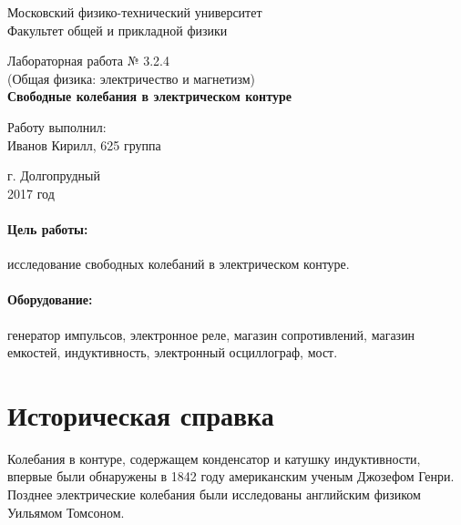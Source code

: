 \documentclass[12pt]{kiarticle}
\begin{document}
\begin{titlepage}
	\begin{center}
		\large 	Московский физико-технический университет \\
		Факультет общей и прикладной физики \\
		\vspace{0.2cm}
		
		\vspace{4.5cm}
		Лабораторная работа № 3.2.4 \\ \vspace{0.2cm}
		\large (Общая физика: электричество и магнетизм) \\ \vspace{0.2cm}
		\LARGE \textbf{Свободные колебания в электрическом контуре}
	\end{center}
	\vspace{2.3cm} \large
	
	\begin{center}
		Работу выполнил: \\
		Иванов Кирилл,
		625 группа
		\vspace{10mm}
		
	
		
		
	\end{center}
	
	\begin{center} \vspace{60mm}
		г. Долгопрудный \\
		 2017 год
	\end{center}
\end{titlepage}




\paragraph*{Цель работы:} исследование свободных колебаний в электрическом контуре.

\paragraph*{Оборудование:} генератор импульсов, электронное реле, магазин сопротивлений, магазин емкостей, индуктивность, электронный осциллограф, мост.


\section{Историческая справка}

Колебания в контуре, содержащем конденсатор и катушку индуктивности, впервые были обнаружены в 1842 году американским ученым Джозефом Генри. Позднее электрические колебания были исследованы английским физиком Уильямом Томсоном. 
\end{document}
